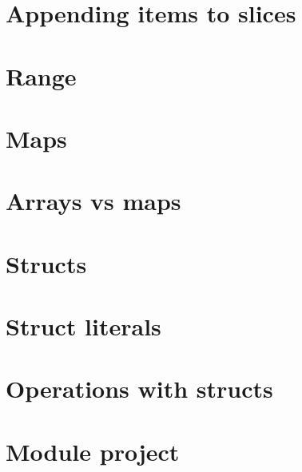\documentclass[]{book}
\begin{document}
\hypertarget{appending-items-to-slices}{%
\section{Appending items to slices}\label{appending-items-to-slices}}

\hypertarget{range}{%
\section{Range}\label{range}}

\hypertarget{maps}{%
\section{Maps}\label{maps}}

\hypertarget{arrays-vs-maps}{%
\section{Arrays vs maps}\label{arrays-vs-maps}}

\hypertarget{structs}{%
\section{Structs}\label{structs}}

\hypertarget{struct-literals}{%
\section{Struct literals}\label{struct-literals}}

\hypertarget{operations-with-structs}{%
\section{Operations with structs}\label{operations-with-structs}}

\hypertarget{module-project-1}{%
\section*{Module project}\label{module-project-1}}
\end{document}
